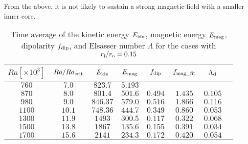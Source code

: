 From the above, it is not likely to sustain a strong magnetic field with a smaller inner core.
%
\begin{table*}
 \begin{center}
\caption{Time average of the kinetic energy $E_{\rm kin}$, magnetic energy $E_{\rm mag}$, dipolarity $f_{\rm dip}$, and Elsasser number $\Lambda$ for the cases with $r_{\rm i}/r_{\rm o} = 0.15$}
  \begin{tabular}{cccccccc}
      \hline
     $Ra[\times 10^3]$  &  $Ra/Ra_{\rm crit}$&  $E_{\rm kin}$  &  $E_{\rm mag}$ & $f_{\rm dip}$ & $f_{\rm mag\_fit}$ & $\Lambda_{\rm d}$\\
    \hline \hline
    $760$  & $7.0$ &  $823.7$ & $5.193$ & $-$ & $-$ & $-$\\
    $870$  & $8.0$ &  $801.4$ & $501.6$ & $0.494$ & $1.435$ & $0.105$\\
    $980$  & $9.0$ &  $846.37$ & $579.0$ & $0.516$ & $1.866$ &$0.116$\\
    $1100$  & $10.1$ &  $748.36$ & $444.7$ & $0.349$ & $0.860$ & $0.053$\\
    $1300$  & $11.9$ &  $1493$ & $300.5$ & $0.117$ & $0.322$ & $0.068$\\
    $1500$  & $13.8$ &  $1867$ & $135.6$ & $0.155$ & $0.391$ & $0.034$\\
    $1700$  & $15.6$ &  $2141$ & $234.3$ & $0.172$ & $0.420$ & $0.054$\\
     \hline
  \end{tabular}
 \end{center}
 \label{table:Summary_15}
 \end{table*}
 
